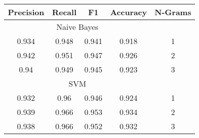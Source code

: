  \begin{tabular}{cccc | c}  \hline Precision & Recall & F1 & Accuracy & N-Grams \\  \hline \multicolumn{4}{c|}{Naive Bayes} &  \\ 0.934 & 0.948 & 0.941 & 0.918 & 1  \\  0.942 & 0.951 & 0.947 & 0.926 & 2  \\  0.94 & 0.949 & 0.945 & 0.923 & 3  \\  \hline \multicolumn{4}{c|}{SVM} &  \\ 0.932 & 0.96 & 0.946 & 0.924 & 1  \\  0.939 & 0.966 & 0.953 & 0.934 & 2  \\  0.938 & 0.966 & 0.952 & 0.932 & 3  \\  \hline \end{tabular}